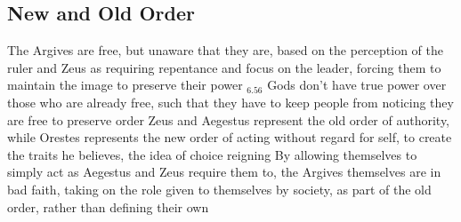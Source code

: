 \documentclass[11 pt, twoside]{article}
\newenvironment{outline*}
{
	\begin{outline}[enumerate]
	}
	{\end{outline}
}
\newcommand{\footb}[2]{\hyperlink{#1}{$_{#1.#2}$}}
\begin{document}
\subsection{New and Old Order}
\begin{outline*}
\1 The Argives are free, but unaware that they are, based on the perception of the ruler and Zeus as requiring repentance and focus on the leader, forcing them to maintain the image to preserve their power \footb{6}{56}
\2 Gods don't have true power over those who are already free, such that they have to keep people from noticing they are free to preserve order
\2 Zeus and Aegestus represent the old order of authority, while Orestes represents the new order of acting without regard for self, to create the traits he believes, the idea of choice reigning
\1 By allowing themselves to simply act as Aegestus and Zeus require them to, the Argives themselves are in bad faith, taking on the role given to themselves by society, as part of the old order, rather than defining their own
\end{outline*}
\end{document}
